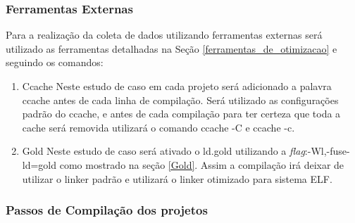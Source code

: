 \subsubsection{Ferramentas Externas}

	Para a realização da coleta de dados utilizando ferramentas
 externas será utilizado as ferramentas detalhadas na Seção 
\ref{ferramentas_de_otimizacao} e seguindo os comandos:

        \begin{enumerate}
               \item Ccache
                    \subitem Neste estudo de caso em cada projeto será adicionado
 a palavra ccache antes de cada linha de compilação. Será utilizado as
 configurações padrão do ccache, e antes de cada compilação para ter certeza
 que toda a cache será removida utilizará o comando ccache -C e ccache -c.
                \item Gold
                    \subitem Neste estudo de caso será ativado o ld.gold
 utilizando a \textit{flag}:-Wl,-fuse-ld=gold como mostrado na seção \ref{Gold}. Assim  a
 compilação irá deixar de utilizar o linker padrão e utilizará o linker
 otimizado para sistema ELF.
        \end{enumerate}

\subsubsection{Passos de Compilação dos projetos}

